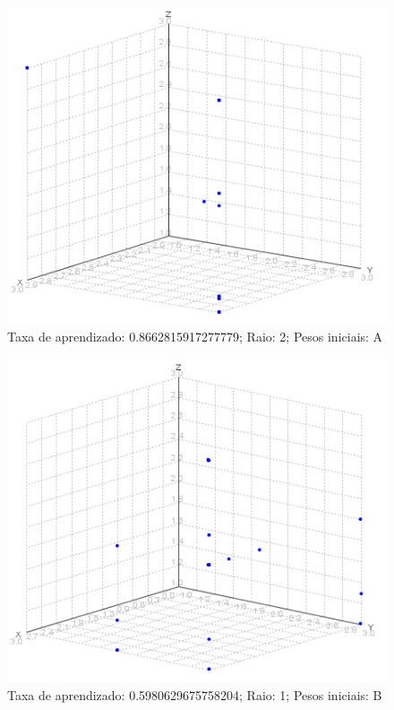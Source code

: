 \begin{figure}[ht!]
	\centering
	\includegraphics[scale=0.4]{./imgs/2a2.png}
	\caption{Taxa de aprendizado: 0.8662815917277779; Raio: 2; Pesos iniciais: A}
\end{figure}

\begin{figure}[ht!]
	\centering
	\includegraphics[scale=0.4]{./imgs/2b1.png}
	\caption{Taxa de aprendizado: 0.5980629675758204; Raio: 1; Pesos iniciais: B}
\end{figure}


